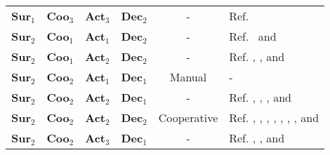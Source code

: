 \begin{table}[h]
\begin{center}
\begin{tabular}{lccccl}
        \textbf{Sur}$_1$ & \textbf{Coo}$_3$ & \textbf{Act}$_3$  & \textbf{Dec}$_2$ & - & Ref. \cite{Teo:04}\\
        \textbf{Sur}$_2$ & \textbf{Coo}$_1$ & \textbf{Act}$_1$  & \textbf{Dec}$_2$ & - & Ref.~\cite{Beard:02} and \cite{Duan:09}\tnote{\dag} \\
        \textbf{Sur}$_2$ & \textbf{Coo}$_1$ & \textbf{Act}$_2$  & \textbf{Dec}$_2$ & - & Ref.  \cite{Richards:03}, \cite{Chipalkatty:12}\tnote{\ddag}, and \cite{Hurley:13}\tnote{\dag}  \\
        \textbf{Sur}$_2$ & \textbf{Coo}$_2$ & \textbf{Act}$_1$  & \textbf{Dec}$_1$ & Manual & -\\ 
       \textbf{Sur}$_2$ & \textbf{Coo}$_2$ & \textbf{Act}$_2$  & \textbf{Dec}$_1$ & - & Ref. \cite{Hoekstra:02}\tnote{\ddag}, \cite{Hoekstra:00}\tnote{\ddag}, \cite{Ellerbroek:11}\tnote{\ddag}, and \cite{Ellerbroek:13}\tnote{\ddag}\\
        \textbf{Sur}$_2$ & \textbf{Coo}$_2$ & \textbf{Act}$_2$  & \textbf{Dec}$_2$ & Cooperative & Ref. \cite{Paielli:03}, \cite{Richards:04}, \cite{Park:08}, \cite{Paul:08}, \cite{Mujumdar:11}, \cite{Prevost:11},  \cite{Yoo:11},  and \cite{Jenie:13b} \\
       \textbf{Sur}$_2$ & \textbf{Coo}$_2$ & \textbf{Act}$_3$  & \textbf{Dec}$_1$ & - & Ref. \cite{LeTallec:05}, \cite{Zeitlin:07}, and \cite{Kochenderfer:12}\tnote{\ddag}\\

\end{tabular}
\end{center}
\end{table}
